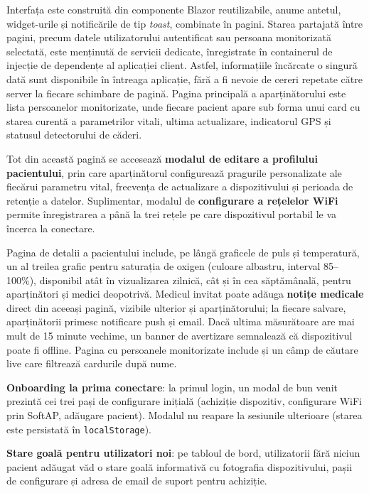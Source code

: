 \documentclass[12pt,a4paper,twoside]{article}
\begin{document}
Interfața este construită din componente Blazor reutilizabile, anume antetul, widget-urile și notificările de tip \textit{toast}, combinate în pagini. Starea partajată între pagini, precum datele utilizatorului autentificat sau persoana monitorizată selectată, este menținută de servicii dedicate, înregistrate în containerul de injecție de dependențe al aplicației client. Astfel, informațiile încărcate o singură dată sunt disponibile în întreaga aplicație, fără a fi nevoie de cereri repetate către server la fiecare schimbare de pagină. Pagina principală a aparținătorului este lista persoanelor monitorizate, unde fiecare pacient apare sub forma unui card cu starea curentă a parametrilor vitali, ultima actualizare, indicatorul GPS și statusul detectorului de căderi.

Tot din această pagină se accesează \textbf{modalul de editare a profilului pacientului}, prin care aparținătorul configurează pragurile personalizate ale fiecărui parametru vital, frecvența de actualizare a dispozitivului și perioada de retenție a datelor. Suplimentar, modalul de \textbf{configurare a rețelelor WiFi} permite înregistrarea a până la trei rețele pe care dispozitivul portabil le va încerca la conectare.

Pagina de detalii a pacientului include, pe lângă graficele de puls și temperatură, un al treilea grafic pentru saturația de oxigen (culoare albastru, interval 85--100\%), disponibil atât în vizualizarea zilnică, cât și în cea săptămânală, pentru aparținători și medici deopotrivă. Medicul invitat poate adăuga \textbf{notițe medicale} direct din aceeași pagină, vizibile ulterior și aparținătorului; la fiecare salvare, aparținătorii primesc notificare push și email. Dacă ultima măsurătoare are mai mult de 15 minute vechime, un banner de avertizare semnalează că dispozitivul poate fi offline. Pagina cu persoanele monitorizate include și un câmp de căutare live care filtrează cardurile după nume.

\textbf{Onboarding la prima conectare}: la primul login, un modal de bun venit prezintă cei trei pași de configurare inițială (achiziție dispozitiv, configurare WiFi prin SoftAP, adăugare pacient). Modalul nu reapare la sesiunile ulterioare (starea este persistată în \texttt{localStorage}).

\textbf{Stare goală pentru utilizatori noi}: pe tabloul de bord, utilizatorii fără niciun pacient adăugat văd o stare goală informativă cu fotografia dispozitivului, pașii de configurare și adresa de email de suport pentru achiziție.
\end{document}
